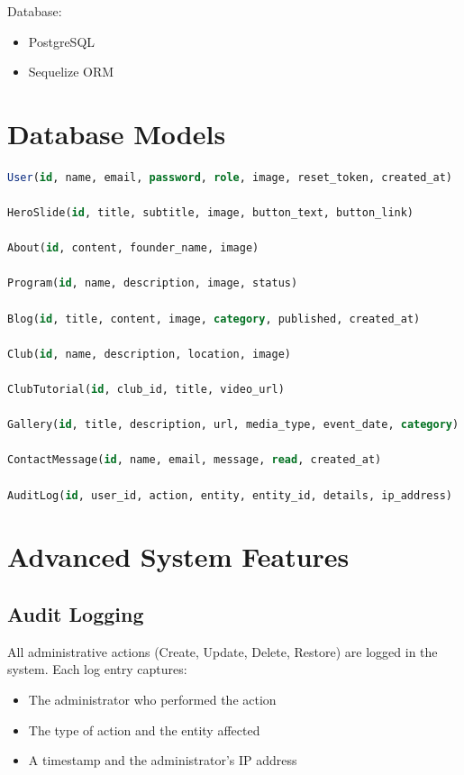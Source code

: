 \documentclass[12pt,a4paper]{article}
\begin{document}
Database:
\begin{itemize}
    \item PostgreSQL
    \item Sequelize ORM
\end{itemize}

\section{Database Models}

\begin{lstlisting}[language=SQL]
User(id, name, email, password, role, image, reset_token, created_at)

HeroSlide(id, title, subtitle, image, button_text, button_link)

About(id, content, founder_name, image)

Program(id, name, description, image, status)

Blog(id, title, content, image, category, published, created_at)

Club(id, name, description, location, image)

ClubTutorial(id, club_id, title, video_url)

Gallery(id, title, description, url, media_type, event_date, category)

ContactMessage(id, name, email, message, read, created_at)

AuditLog(id, user_id, action, entity, entity_id, details, ip_address)
\end{lstlisting}

\section{Advanced System Features}

\subsection{Audit Logging}
All administrative actions (Create, Update, Delete, Restore) are logged in the system. Each log entry captures:
\begin{itemize}
    \item The administrator who performed the action
    \item The type of action and the entity affected
    \item A timestamp and the administrator's IP address
\end{itemize}
\end{document}

